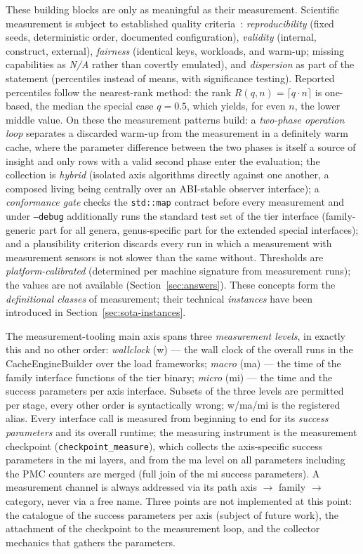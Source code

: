 \begin{nurkurz}
These building blocks are only as meaningful as their measurement. Scientific measurement is subject to
established quality criteria~\cite{hoefler2015benchmarking}: \emph{reproducibility} (fixed seeds,
deterministic order, documented configuration), \emph{validity} (internal, construct, external),
\emph{fairness} (identical keys, workloads, and warm-up; missing capabilities as \emph{N/A} rather than
covertly emulated), and \emph{dispersion} as part of the statement (percentiles instead of means, with
significance testing). Reported percentiles follow the nearest-rank method: the rank
$R(q,n)=\lceil q\cdot n\rceil$ is one-based, the median the special case $q=0.5$, which yields, for even
$n$, the lower middle value. On these the measurement patterns build: a \emph{two-phase operation loop}
separates a discarded warm-up from the measurement in a definitely warm cache, where the parameter
difference between the two phases is itself a source of insight and only rows with a valid second phase
enter the evaluation; the collection is \emph{hybrid} (isolated axis algorithms directly against one
another, a composed living being centrally over an ABI-stable observer interface); a \emph{conformance
gate} checks the \texttt{std::map} contract before every measurement and under \texttt{--debug} additionally
runs the standard test set of the tier interface (family-generic part for all genera, genus-specific part
for the extended special interfaces); and a plausibility criterion
discards every run in which a measurement with measurement sensors is not slower than the same without.
Thresholds are \emph{platform-calibrated} (determined per machine signature from measurement runs); the
values are not available (Section~\ref{sec:answers}). These concepts form the \emph{definitional classes}
of measurement; their technical \emph{instances} have been introduced in Section~\ref{sec:sota-instances}.
\end{nurkurz}

The measurement-tooling main axis spans three \emph{measurement levels}, in exactly this
and no other order: \emph{wallclock} (w) --- the wall clock of the overall runs in the
CacheEngineBuilder over the load frameworks; \emph{macro} (ma) --- the time of the
family interface functions of the tier binary; \emph{micro} (mi) --- the time and the success parameters per
axis interface. Subsets of the three levels are permitted per stage, every other order is
syntactically wrong; w/ma/mi is the registered alias. Every interface call is measured from beginning to end
for its \emph{success parameters} and its overall runtime; the measuring instrument is the
measurement checkpoint (\texttt{checkpoint\_measure}), which collects the axis-specific
success parameters in the mi layers, and from the ma level on all parameters including the PMC counters
are merged (full join of the mi success parameters). A measurement channel is always addressed via its path axis
$\to$ family $\to$ category, never via a free name. Three points are not
implemented at this point: the catalogue of the success parameters per axis (subject of future work), the
attachment of the checkpoint to the measurement loop, and the collector mechanics that
gathers the parameters.

